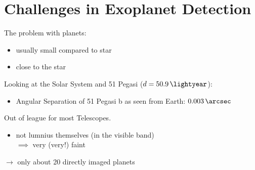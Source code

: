 \documentclass[presentation,t,aspectratio=169]{beamer}
\begin{document}
\section{Challenges in Exoplanet Detection}
\begin{frame}
  The problem with planets:
  \begin{itemize}
  \item usually small compared to star
    \pause
  \item close to the star
  \end{itemize}
  \pause
  \begin{example}
    Looking at the Solar System and 51 Pegasi ($d=\SI{50.9}{\lightyear}$):
    \begin{itemize}
    \item Angular Separation of 51 Pegasi b as seen from Earth: $\SI{0.003}{\arcsec}$
    \end{itemize}
    \pause
    Out of league for most Telescopes.
  \end{example}
  \pause
  \begin{itemize}
  \item not lumnius themselves (in the visible band) \\
    $\implies$ \alert{very (very!) faint}
  \end{itemize}
  \pause
  $\longrightarrow$ only about 20 directly imaged planets
\end{frame}
\end{document}
